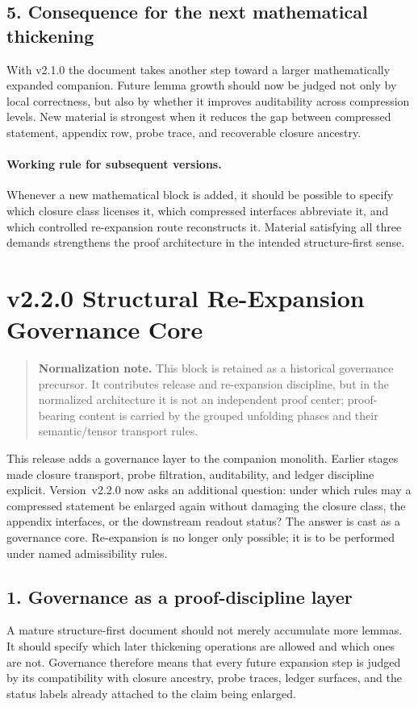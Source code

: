 \subsection*{5. Consequence for the next mathematical thickening}
With v2.1.0 the document takes another step toward a larger mathematically
expanded companion. Future lemma growth should now be judged not only by local
correctness, but also by whether it improves auditability across compression
levels. New material is strongest when it reduces the gap between compressed
statement, appendix row, probe trace, and recoverable closure ancestry.

\paragraph{Working rule for subsequent versions.}
Whenever a new mathematical block is added, it should be possible to specify
which closure class licenses it, which compressed interfaces abbreviate it, and
which controlled re-expansion route reconstructs it. Material satisfying all
three demands strengthens the proof architecture in the intended structure-first
sense.



\clearpage
\section*{v2.2.0 Structural Re-Expansion Governance Core}
\begin{quote}
\textbf{Normalization note.} This block is retained as a historical governance precursor. It contributes release and re-expansion discipline, but in the normalized architecture it is not an independent proof center; proof-bearing content is carried by the grouped unfolding phases and their semantic/tensor transport rules.
\end{quote}

This release adds a governance layer to the companion monolith. Earlier stages
made closure transport, probe filtration, auditability, and ledger discipline
explicit. Version~v2.2.0 now asks an additional question: under which
rules may a compressed statement be enlarged again without damaging the closure
class, the appendix interfaces, or the downstream readout status? The answer is
cast as a governance core. Re-expansion is no longer only possible; it is to be
performed under named admissibility rules.

\subsection*{1. Governance as a proof-discipline layer}
A mature structure-first document should not merely accumulate more lemmas. It
should specify which later thickening operations are allowed and which ones are
not. Governance therefore means that every future expansion step is judged by
its compatibility with closure ancestry, probe traces, ledger surfaces, and the
status labels already attached to the claim being enlarged.

